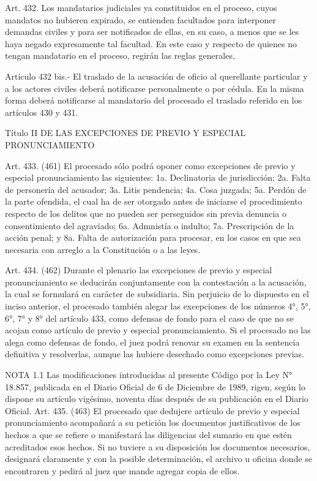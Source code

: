     Art. 432. Los mandatarios judiciales ya constituidos en el proceso, cuyos mandatos no hubieren expirado, se entienden facultados para interponer demandas civiles y para ser notificados de ellas, en su caso, a menos que se les haya negado expresamente tal facultad. En este caso y respecto de quienes no tengan mandatario en el proceso, regirán las reglas generales.

    Artículo 432 bis.- El traslado de la acusación de oficio al querellante particular y a los actores civiles deberá notificarse personalmente o por cédula.
    En la misma forma deberá notificarse al mandatario del procesado el traslado referido en los artículos 430 y 431.

  Título II
  DE LAS EXCEPCIONES DE PREVIO Y ESPECIAL
PRONUNCIAMIENTO

    Art. 433. (461) El procesado sólo podrá oponer como excepciones de previo y especial pronunciamiento las siguientes:
    1a. Declinatoria de jurisdicción;
    2a. Falta de personería del acusador;
    3a. Litis pendencia;
    4a. Cosa juzgada;
    5a. Perdón de la parte ofendida, el cual ha de ser otorgado antes de iniciarse el procedimiento respecto de los delitos que no pueden ser perseguidos sin previa denuncia o consentimiento del agraviado;
    6a. Admnistía o indulto;
    7a. Prescripción de la acción penal; y
    8a. Falta de autorización para procesar, en los casos en que sea necesaria con arreglo a la Constitución o a las leyes.



    Art. 434. (462) Durante el plenario las excepciones de previo y especial pronunciamiento se deducirán conjuntamente con la contestación a la acusación, la cual se formulará en carácter de subsidiaria.
    Sin perjuicio de lo dispuesto en el inciso anterior, el procesado también alegar las excepciones de los números 4°, 5°, 6°, 7° y 8° del artículo 433, como defensas de fondo para el caso de que no se acojan como artículo de previo y especial pronunciamiento.
    Si el procesado no las alega como defensas de fondo, el juez podrá renovar su examen en la sentencia definitiva y resolverlas, aunque las hubiere desechado como excepciones previas.
   




NOTA 1.1
    Las modificaciones introducidas al presente Código por la Ley N° 18.857, publicada en el Diario Oficial de 6 de Diciembre de 1989, rigen, según lo dispone su artículo vigésimo, noventa días después de su publicación en el Diario Oficial.
    Art. 435. (463) El procesado que dedujere artículo de previo y especial pronunciamiento acompañará a su petición los documentos justificativos de los hechos a que se refiere o manifestará las diligencias del sumario en que estén acreditados esos hechos. Si no tuviere a su disposición los documentos necesarios, designará claramente y con la posible determinación, el archivo u oficina donde se encontraren y pedirá al juez que mande agregar copia de ellos.


